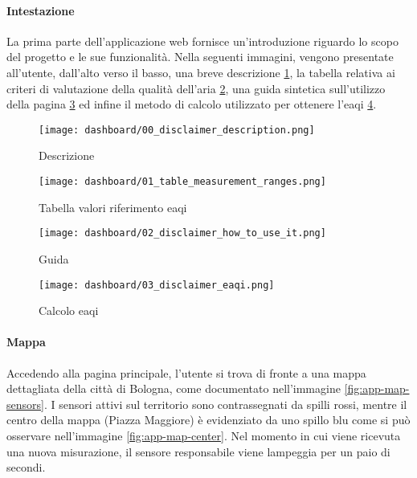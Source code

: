 \paragraph{Intestazione}

La prima parte dell'applicazione web fornisce un'introduzione riguardo lo scopo del progetto e le sue funzionalità.
Nella seguenti immagini, vengono presentate all'utente, dall'alto verso il basso,
una breve descrizione \ref{fig:app-description},
la tabella relativa ai criteri di valutazione della qualità dell'aria \ref{fig:app-eaqi-table},
una guida sintetica sull'utilizzo della pagina \ref{fig:app-guide} ed infine
il metodo di calcolo utilizzato per ottenere l'\acrfull{eaqi} \ref{fig:app-eaqi-calculation}.

\begin{figure}[H]
  \centering
  \texttt{[image: dashboard/00\_disclaimer\_description.png]}
  \caption{Descrizione}
  \label{fig:app-description}
\end{figure}

\begin{figure}[H]
  \centering
  \texttt{[image: dashboard/01\_table\_measurement\_ranges.png]}
  \caption{Tabella valori riferimento \acrfull{eaqi}}
  \label{fig:app-eaqi-table}
\end{figure}

\begin{figure}[H]
  \centering
  \texttt{[image: dashboard/02\_disclaimer\_how\_to\_use\_it.png]}
  \caption{Guida}
  \label{fig:app-guide}
\end{figure}

\begin{figure}[H]
  \centering
  \texttt{[image: dashboard/03\_disclaimer\_eaqi.png]}
  \caption{Calcolo \acrfull{eaqi}}
  \label{fig:app-eaqi-calculation}
\end{figure}

\paragraph{Mappa}

Accedendo alla pagina principale, l'utente si trova di fronte a una mappa dettagliata della città di Bologna,
come documentato nell'immagine \ref{fig:app-map-sensors}. I sensori attivi sul territorio
sono contrassegnati da spilli rossi, mentre il centro della mappa (Piazza Maggiore) è evidenziato da uno spillo blu
come si può osservare nell'immagine \ref{fig:app-map-center}. Nel momento in cui viene ricevuta una nuova misurazione,
il sensore responsabile viene lampeggia per un paio di secondi.

